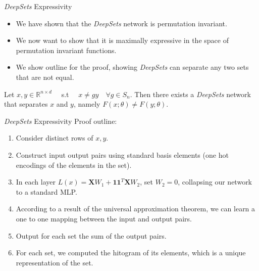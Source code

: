 \documentclass{beamer}
\begin{document}
\begin{frame}{\emph{DeepSets} Expressivity}
    \begin{itemize}
        \setlength{\itemsep}{\fill}
        \item We have shown that the \emph{DeepSets} network is permutation invariant.
        \item We now want to show that it is maximally expressive in the space of permutation invariant functions.
        \item We show outline for the proof, showing \emph{DeepSets} can separate any two sets that are not equal.

    \end{itemize}
    \begin{theorem}
        Let $x,y \in \mathbb{R}^{n \times d} \quad$ s.t $\quad x \neq gy \quad \forall g \in S_n$. Then there exists a \emph{DeepSets} network that separates $x$ and $y$, namely $F(x ; \theta) \neq F(y ; \theta)$. 
    \end{theorem}
    
    

\end{frame}
\begin{frame}{\emph{DeepSets} Expressivity}
    Proof outline:
    \begin{enumerate}
        \setlength{\itemsep}{\fill}
        \item Consider distinct rows of $x, y$.
        \item Construct input output pairs using standard basis elements (one hot encodings of the elements in the set).
        \item In each layer $L(x) = \mathbf{X}W_1 + \mathbf{1}\mathbf{1}^T\mathbf{X}W_2$, set $W_2 = 0$, collapsing our network to a standard MLP.
        \item According to a result of the universal approximation theorem, we can learn a one to one mapping between the input and output pairs.
        \item Output for each set the sum of the output pairs.
        \item For each set, we computed the  hitogram of its elements, which is a unique representation of the set.
    \end{enumerate}


\end{frame}
\end{document}
